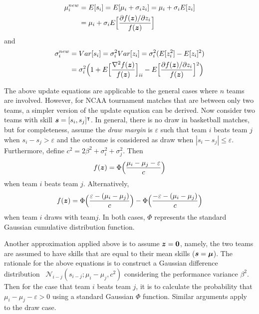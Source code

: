\begin{equation}\label{Eqn: mu_update}
\begin{split}
\mu_{i}^{new} &= E[s_{i}] = E[\mu_{i} + \sigma_{i}z_{i}] = \mu_{i} + \sigma_{i}E[z_{i}] \\ 
&= \mu_{i} + \sigma_{i}E\Big{[}\frac{\partial f(\bm{z}) / \partial z_{i}}{f(\bm{z})}\Big{]}
\end{split}
\end{equation}
and
\begin{equation}\label{Eqn: sigma_update}
\begin{split}
\sigma_{i}^{new} &= Var[s_{i}] = \sigma_{i}^{2}Var[z_{i}] = \sigma_{i}^{2}(E[z_{i}^{2}] - E[z_{i}]^{2}) \\
&= \sigma_{i}^{2}\Big{(}1 + E\Big{[}\frac{\nabla^{2} f(\bm{z})}{f(\bm{z})}\Big{]}_{ii} - E\Big{[}\frac{\partial f(\bm{z}) / \partial z_{i}}{f(\bm{z})}\Big{]}^{2}\Big{)}
\end{split}
\end{equation}

The above update equations are applicable to the general cases where $n$ teams are involved. However, for NCAA tournament matches that are between only two teams, a simpler version of the update equation can be derived. Now consider two teams with skill $\bm{s} = [s_{i}, s_{j}]^{\intercal}$. In general, there is no draw in basketball matches, but for completeness, assume the \emph{draw margin} is $\varepsilon$ such that team $i$ beats team $j$ when $s_{i} - s_{j} > \varepsilon$ and the outcome is considered as draw when $| s_{i} - s_{j} | \leq \varepsilon$. Furthermore, define $c^{2} = 2\beta^{2} + \sigma_{i}^{2} + \sigma_{j}^{2}$. Then 
\begin{equation}
f(\bm{z}) = \Phi \Big{(} \frac{\mu_{i} - \mu_{j} - \varepsilon}{c}  \Big{)}
\end{equation}
when team $i$ beats team $j$. Alternatively, 
\begin{equation}
f(\bm{z}) = \Phi \Big{(} \frac{\varepsilon - (\mu_{i} - \mu_{j}) }{c}  \Big{)} - \Phi \Big{(} \frac{- \varepsilon - (\mu_{i} - \mu_{j}) }{c}  \Big{)}
\end{equation}
when team $i$ draws with team$j$. In both cases, $\Phi$ represents the standard Gaussian cumulative distribution function. 

Another approximation applied above is to assume $\bm{z} = \bm{0}$, namely, the two teams are assumed to have skills that are equal to their mean skills ($\bm{s} = \bm{\mu}$). The rationale for the above equations is to construct a Gaussian difference distribution~\cite{WR17} $\mathcal{N}_{i - j}(s_{i - j}; \mu_{i} - \mu_{j}, c^{2})$ considering the performance variance $\beta^{2}$. Then for the case that team $i$ beats team $j$, it is to calculate the probability that $\mu_{i} - \mu_{j} - \varepsilon > 0$ using a standard Gaussian $\Phi$ function. Similar arguments apply to the draw case. 

